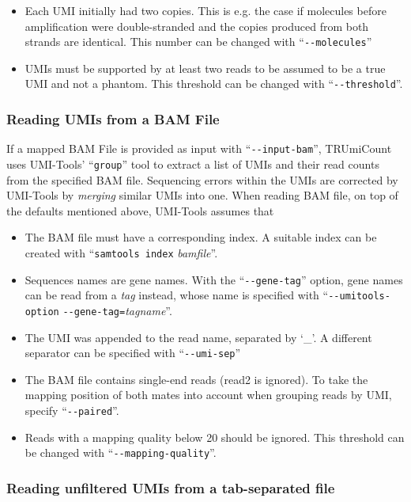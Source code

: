 \documentclass[a4paper]{scrartcl}
\newcommand{\ddarg}[1]{\texttt{-{}-#1}}
\begin{document}
\begin{itemize}
  \item Each UMI initially had two copies. This is e.g. the case if molecules before amplification were double-stranded and the copies produced from both strands are identical. This number can be changed with ``\ddarg{molecules}''
  \item UMIs must be supported by at least two reads to be assumed to be a true UMI and not a phantom. This threshold can be changed with ``\ddarg{threshold}''.
\end{itemize}

\subsubsection*{Reading UMIs from a BAM File}\label{input-bam}

If a mapped BAM File is provided as input with ``\ddarg{input-bam}'', TRUmiCount uses UMI-Tools' ``\texttt{group}'' tool to extract a list of UMIs and their read counts from the specified BAM file. Sequencing errors within the UMIs are corrected by UMI-Tools by \emph{merging} similar UMIs into one. When reading BAM file, on top of the defaults mentioned above, UMI-Tools assumes that
\begin{itemize}
  \item The BAM file must have a corresponding index. A suitable index can be created with ``\texttt{samtools index} \textit{bamfile}''.
  \item Sequences names are gene names. With the ``\ddarg{gene-tag}'' option, gene names can be read from a \emph{tag} instead, whose name is specified with ``\ddarg{umitools-option} \allowbreak\ddarg{gene-tag=}\allowbreak\textit{tagname}''.
  \item The UMI was appended to the read name, separated by `\_'. A different separator can be specified with ``\ddarg{umi-sep}''
  \item The BAM file contains single-end reads (read2 is ignored). To take the mapping position of both mates into account when grouping reads by UMI, specify ``\ddarg{paired}''.
  \item Reads with a mapping quality below 20 should be ignored. This threshold can be changed with ``\ddarg{mapping-quality}''.
\end{itemize}

\subsubsection*{Reading unfiltered UMIs from a tab-separated file}
\end{document}
